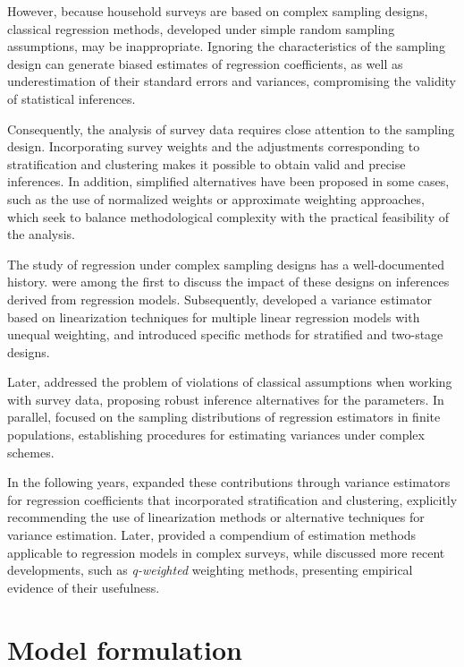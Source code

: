 \documentclass[
  english,
  12pt,
]{book}
\begin{document}
However, because household surveys are based on complex sampling designs, classical regression methods, developed under simple random sampling assumptions, may be inappropriate. Ignoring the characteristics of the sampling design can generate biased estimates of regression coefficients, as well as underestimation of their standard errors and variances, compromising the validity of statistical inferences.

Consequently, the analysis of survey data requires close attention to the sampling design. Incorporating survey weights and the adjustments corresponding to stratification and clustering makes it possible to obtain valid and precise inferences. In addition, simplified alternatives have been proposed in some cases, such as the use of normalized weights or approximate weighting approaches, which seek to balance methodological complexity with the practical feasibility of the analysis.

The study of regression under complex sampling designs has a well-documented history. \citet{kish1974inference} were among the first to discuss the impact of these designs on inferences derived from regression models. Subsequently, \citet{fuller1975regression} developed a variance estimator based on linearization techniques for multiple linear regression models with unequal weighting, and introduced specific methods for stratified and two-stage designs.

Later, \citet{shah1977inference} addressed the problem of violations of classical assumptions when working with survey data, proposing robust inference alternatives for the parameters. In parallel, \citet{binder1983variances} focused on the sampling distributions of regression estimators in finite populations, establishing procedures for estimating variances under complex schemes.

In the following years, \citet{skinner1989analysis} expanded these contributions through variance estimators for regression coefficients that incorporated stratification and clustering, explicitly recommending the use of linearization methods or alternative techniques for variance estimation. Later, \citet{fuller2002regression} provided a compendium of estimation methods applicable to regression models in complex surveys, while \citet{pfeffermann2011modelling} discussed more recent developments, such as \emph{q-weighted} weighting methods, presenting empirical evidence of their usefulness.

\section{Model formulation}\label{formulacion-del-modelo}
\end{document}
